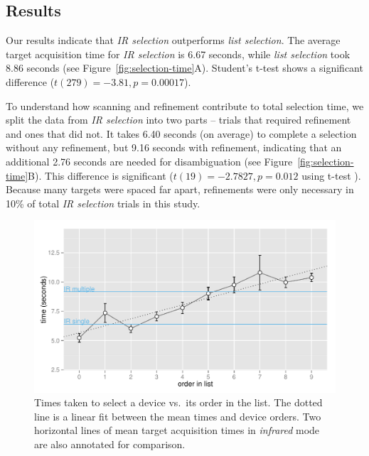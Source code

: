 \subsection{Results}
Our results indicate that {\em IR selection} outperforms {\em list selection}.  The average target acquisition time for {\em IR selection} is 6.67 seconds, while {\em list selection} took 8.86 seconds (see Figure~\ref{fig:selection-time}A). Student's t-test shows a significant difference ($t(279)=-3.81, p=0.00017$).

To understand how scanning and refinement contribute to total selection time, we split the data from {\em IR selection} into two parts -- trials that required refinement and ones that did not. It takes 6.40 seconds (on average) to complete  a selection without any refinement, but 9.16 seconds with refinement, indicating that an additional 2.76 seconds are needed for disambiguation (see Figure~\ref{fig:selection-time}B). This difference is significant ($t(19)=-2.7827, p=0.012$ using t-test ). Because many targets were spaced far apart, refinements were only necessary in 10\% of total {\em IR selection} trials in this study.


\begin{figure}[t]
\centering
\includegraphics[width=1.0\columnwidth]{figures/R_List_by_Target.pdf}
\caption{Times taken to select a device vs.~its order in the list. The dotted line is a linear fit between the mean times and device orders. Two horizontal lines of mean target acquisition times in {\em infrared} mode are also annotated for comparison.}
\label{fig:time-vs-list-order}
\end{figure}

